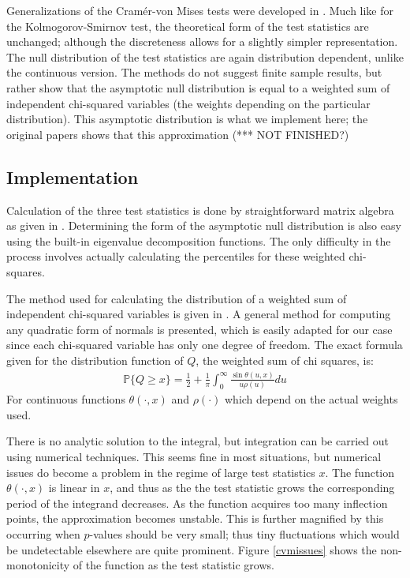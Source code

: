 Generalizations of the Cram\'{e}r-von Mises tests were developed in \cite{choulakian1994}. Much like for the Kolmogorov-Smirnov test,
the theoretical form of the test statistics are unchanged; although the discreteness allows for a slightly simpler representation.
The null distribution of the test statistics are again distribution dependent, unlike the continuous version. The methods do not
suggest finite sample results, but rather show that the asymptotic null distribution is equal to a weighted sum of independent
chi-squared variables (the weights depending on the particular distribution). This asymptotic distribution is what we implement here;
the original papers shows that this approximation (*** NOT FINISHED?)



\subsection{Implementation}

Calculation of the three test statistics is done by straightforward matrix algebra as given in \cite{choulakian1994}. Determining 
the form of the asymptotic null distribution is also easy using the built-in eigenvalue decomposition functions. The only 
difficulty in the process involves actually calculating the percentiles for these weighted chi-squares. 

The method used for calculating the distribution of a weighted sum of independent chi-squared variables is given in \cite{imhof1961}.
A general method for computing any quadratic form of normals is presented, which is easily adapted for our case since
each chi-squared variable has only one degree of freedom. The exact formula given for the distribution function of $Q$, the weighted
sum of chi squares, is:
\begin{align*}
\mathbb{P}\{Q \geq x \} = \frac{1}{2} + \frac{1}{\pi} \int_{0}^{\infty} \frac{\sin\theta(u,x)}{u \rho(u) } du
\end{align*}
For continuous functions $\theta(\cdot, x)$ and $\rho(\cdot)$ which depend on the actual weights used. 

There is no analytic solution to the integral, but integration can be carried out using numerical techniques. This seems
fine in most situations, but numerical issues do become a problem in the regime of large test statistics $x$. The function
$\theta(\cdot, x)$ is linear in $x$, and thus as the the test statistic grows the corresponding period of the integrand 
decreases. As the function acquires too many inflection points, the approximation becomes unstable. This is further
magnified by this occurring when $p$-values should be very small; thus tiny fluctuations which would be undetectable
elsewhere are quite prominent. Figure \ref{cvmissues} shows the non-monotonicity of the function as the test statistic grows.

